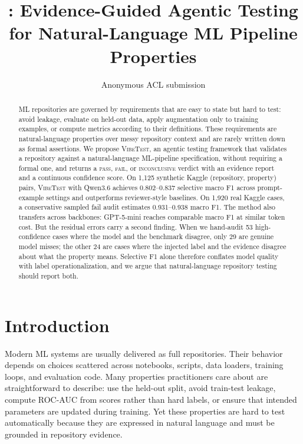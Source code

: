 \documentclass[11pt]{article}
\title{\vibetest: Evidence-Guided Agentic Testing\\for Natural-Language ML Pipeline Properties}
\author{Anonymous ACL submission}
\newcommand{\pass}{\textsc{pass}}
\newcommand{\fail}{\textsc{fail}}
\newcommand{\inconclusive}{\textsc{inconclusive}}
\newcommand{\vibetest}{\textsc{VibeTest}}
\newcommand{\qwen}{Qwen3.6}
\begin{document}
\maketitle

\begin{abstract}
ML repositories are governed by requirements that are easy to state but hard to
test: avoid leakage, evaluate on held-out data, apply augmentation only to
training examples, or compute metrics according to their definitions.
These requirements are natural-language properties over messy repository
context and are rarely written down as formal assertions.
We propose \vibetest, an agentic testing framework that validates a repository
against a natural-language ML-pipeline specification, without requiring a formal
one, and returns a \pass, \fail, or \inconclusive{} verdict with an evidence
report and a continuous confidence score.
On 1,125 synthetic Kaggle (repository, property) pairs, \vibetest{} with \qwen{}
achieves 0.802--0.837 selective macro F1 across prompt-example settings and
outperforms reviewer-style baselines.
On 1,920 real Kaggle cases, a conservative sampled fail audit estimates
0.931--0.938 macro F1.
The method also transfers across backbones: GPT-5-mini reaches comparable macro
F1 at similar token cost.
But the residual errors carry a second finding.
When we hand-audit 53 high-confidence cases where the model and the benchmark
disagree, only 29 are genuine model misses; the other 24 are cases where the
injected label and the evidence disagree about what the property means.
Selective F1 alone therefore conflates model quality with label
operationalization, and we argue that natural-language repository testing should
report both.
\end{abstract}

\section{Introduction}

Modern ML systems are usually delivered as full repositories.
Their behavior depends on choices scattered across notebooks, scripts, data
loaders, training loops, and evaluation code.
Many properties practitioners care about are straightforward to describe:
use the held-out split, avoid train-test leakage, compute ROC-AUC from scores
rather than hard labels, or ensure that intended parameters are updated during
training.
Yet these properties are hard to test automatically because they are expressed
in natural language and must be grounded in repository evidence.
\end{document}
